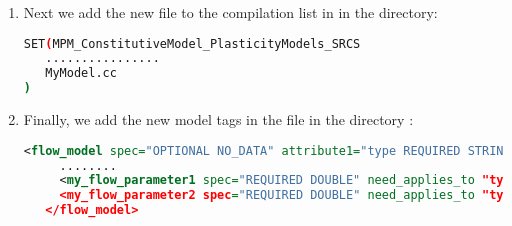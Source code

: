 \begin{enumerate}
  \item Next we add the new file to the compilation list in 
        in the  directory:
\begin{lstlisting}[language=sh, backgroundcolor=\color{background}]
SET(MPM_ConstitutiveModel_PlasticityModels_SRCS
   ................
   MyModel.cc
)
\end{lstlisting}

  \item Finally, we add the new model tags in the  file 
        in the directory :
\begin{lstlisting}[language=XML]
   <flow_model spec="OPTIONAL NO_DATA" attribute1="type REQUIRED STRING 'isotropic_hardening, johnson_cook, mts_model, .... , zerilli_armstrong_polymer, my_flow_model'" >
     ........
     <my_flow_parameter1 spec="REQUIRED DOUBLE" need_applies_to "type my_flow_model"/>
     <my_flow_parameter2 spec="REQUIRED DOUBLE" need_applies_to "type my_flow_model"/>
   </flow_model>
\end{lstlisting}

\end{enumerate}





